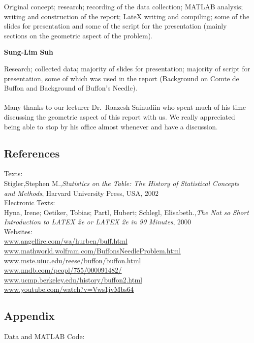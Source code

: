 Original concept; research; recording of the data collection; MATLAB analysis; writing and construction of the report; LateX writing and compiling; some of the slides for presentation and some of the script for the presentation (mainly sections on the geometric aspect of the problem).

\noindent
\textbf{Sung-Lim Suh}

Research; collected data; majority of slides for presentation; majority of script for presentation, some of which was used in the report (Background on Comte de Buffon and Background of Buffon's Needle).
\\
\\
Many thanks to our lecturer Dr.~Raazesh Sainudiin who spent much of his time discussing the geometric aspect of this report with us. We really appreciated being able to stop by his office almost whenever and have a discussion.

\subsection*{References}

Texts:\\
Stigler,Stephen M.,\emph{Statistics on the Table: The History of Statistical Concepts and Methods}, Harvard University Press, USA, 2002\\
Electronic Texts:\\
Hyna, Irene; Oetiker, Tobias; Partl, Hubert; Schlegl, Elisabeth.,\emph{The Not so Short Introduction to LATEX 2e or LATEX 2e in 90 Minutes}, 2000\\
Websites:\\
\url{www.angelfire.com/wa/hurben/buff.html}\\
\url{www.mathworld.wolfram.com/BuffonsNeedleProblem.html}\\
\url{www.mste.uiuc.edu/reese/buffon/buffon.html}\\
\url{www.nndb.com/peopl/755/000091482/}\\
\url{www.ucmp.berkeley.edu/history/buffon2.html}\\
\url{www.youtube.com/watch?v=Vws1jvMbs64}\\

\subsection*{Appendix}

Data and MATLAB Code:

\newpage
